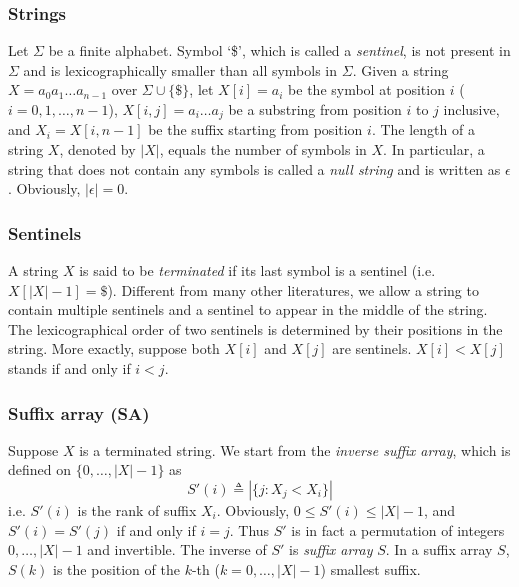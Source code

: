 \documentclass{bioinfo}
\begin{document}
\begin{methods}
\subsubsection{Strings}
Let $\Sigma$ be a finite alphabet. Symbol `\$', which is called a
\emph{sentinel}, is not present in $\Sigma$ and is lexicographically smaller
than all symbols in $\Sigma$. Given a string $X=a_0a_1\ldots a_{n-1}$ over
$\Sigma\cup\{\$\}$, let $X[i]=a_i$ be the symbol at position $i$ ($i=0,1,\ldots,n-1$),
$X[i,j]=a_i\ldots a_j$ be a substring from position $i$ to $j$ inclusive, and
$X_i=X[i,n-1]$ be the suffix starting from position $i$.  The length of a
string $X$, denoted by $|X|$, equals the number of symbols in $X$.  In
particular, a string that does not contain any symbols is called a \emph{null
string} and is written as $\epsilon$. Obviously, $|\epsilon|=0$.

\subsubsection{Sentinels}
A string $X$ is said to be \emph{terminated} if its last symbol is a sentinel
(i.e. $X[|X|-1]=\$$). Different from many other literatures, we allow a string
to contain multiple sentinels and a sentinel to appear in the middle of the
string. The lexicographical order of two sentinels is determined by their
positions in the string. More exactly, suppose both $X[i]$ and $X[j]$ are
sentinels.  $X[i]<X[j]$ stands if and only if $i<j$.

\subsubsection{Suffix array (SA)}
Suppose $X$ is a terminated string. We start from the \emph{inverse suffix
array}, which is defined on $\{0,\ldots,|X|-1\}$ as
\begin{equation}\label{eq:iS}
S'(i)\triangleq|\{j:X_j<X_i\}|
\end{equation}
i.e. $S'(i)$ is the rank of suffix $X_i$.
Obviously, $0\leq S'(i)\leq |X|-1$, and $S'(i)=S'(j)$ if and only if $i=j$.
Thus $S'$ is in fact a permutation of integers $0,\ldots,|X|-1$ and invertible.
The inverse of $S'$ is \emph{suffix array} $S$. In a suffix array $S$, $S(k)$
is the position of the $k$-th ($k=0,\ldots,|X|-1$) smallest suffix.


\end{methods}
\end{document}
